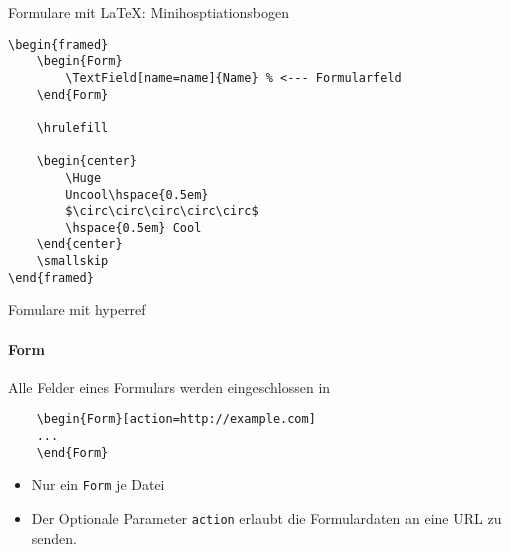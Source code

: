 \documentclass{beamer}
\begin{document}
\begin{frame}[fragile]{Formulare mit \LaTeX: Minihosptiationsbogen}

\begin{verbatim}
\begin{framed}
    \begin{Form}
        \TextField[name=name]{Name} % <--- Formularfeld
    \end{Form}

    \hrulefill

    \begin{center}
        \Huge
        Uncool\hspace{0.5em}
        $\circ\circ\circ\circ\circ$
        \hspace{0.5em} Cool
    \end{center}
    \smallskip
\end{framed}
\end{verbatim}
\end{frame}

\begin{frame}[fragile]{Fomulare mit hyperref}
\framesubtitle{Form}
Alle Felder eines Formulars werden eingeschlossen in
\begin{verbatim}
    \begin{Form}[action=http://example.com]
    ...
    \end{Form}
\end{verbatim}
\begin{itemize}
\item Nur ein \texttt{Form} je Datei
\item Der Optionale Parameter \texttt{action} erlaubt die Formulardaten an eine URL zu senden.
\end{itemize}
\end{frame}


\end{document}
